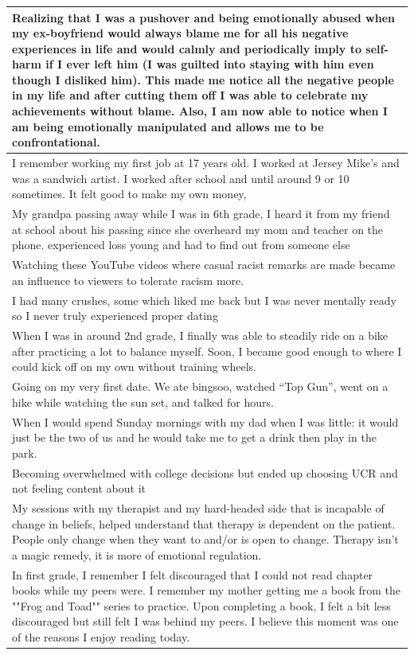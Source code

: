 \documentclass[
  .7em,
  letterpaper,
  DIV=11,
  numbers=noendperiod]{scrartcl}
\begin{document}
\begin{table}
\begin{tabular}{l}
\hline
Realizing that I was a pushover and being emotionally abused when my ex-boyfriend would always blame me for all his negative experiences in life and would calmly and periodically imply to self-harm if I ever left him (I was guilted into staying with him even though I disliked him). This made me notice all the negative people in my life and after cutting them off I was able to celebrate my achievements without blame. Also, I am now able to notice when I am being emotionally manipulated and allows me to be confrontational.\\
\hline
I remember working my first job at 17 years old. I worked at Jersey Mike's and was a sandwich artist. I worked after school and until around 9 or 10 sometimes. It felt good to make my own money,\\
\hline
My grandpa passing away while I was in 6th grade, I heard it from my friend at school about his passing since she overheard my mom and teacher on the phone. experienced loss young and had to find out from someone else\\
\hline
Watching these YouTube videos where casual racist remarks are made became an influence to viewers to tolerate racism more.\\
\hline
I had many crushes, some which liked me back but I was never mentally ready so I never truly experienced proper dating\\
\hline
When I was in around 2nd grade, I finally was able to steadily ride on a bike after practicing a lot to balance myself. Soon, I became good enough to where I could kick off on my own without training wheels.\\
\hline
Going on my very first date. We ate bingsoo, watched “Top Gun”, went on a hike while watching the sun set, and talked for hours.\\
\hline
When I would spend Sunday mornings with my dad when I was little: it would just be the two of us and he would take me to get a drink then play in the park.\\
\hline
Becoming overwhelmed with college decisions but ended up choosing UCR and not feeling content about it\\
\hline
My sessions with my therapist and my hard-headed side that is incapable of change in beliefs, helped understand that therapy is dependent on the patient. People only change when they want to and/or is open to change. Therapy isn't a magic remedy, it is more of emotional regulation.\\
\hline
In first grade, I remember I felt discouraged that I could not read chapter books while my peers were. I remember my mother getting me a book from the ""Frog and Toad"" series to practice. Upon completing a book, I felt a bit less discouraged but still felt I was behind my peers. I believe this moment was one of the reasons I enjoy reading today.\\

\end{tabular}
\end{table}
\end{document}
